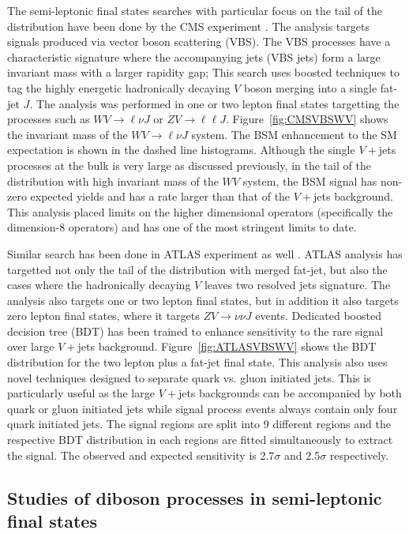 \documentclass[10pt]{article}
\begin{document}
The semi-leptonic final states searches with particular focus on the tail of the distribution have been done by the CMS experiment \cite{}.
The analysis targets signals produced via vector boson scattering (VBS).
The VBS processes have a characteristic signature where the accompanying jets (VBS jets) form a large invariant mass with a larger rapidity gap;
This search uses boosted techniques to tag the highly energetic hadronically decaying $V$ boson merging into a single fat-jet $J$.
The analysis was performed in one or two lepton final states targetting the processes such as $WV\to \ell\nu J$ or $ZV\to \ell\ell J$.
Figure~\ref{fig:CMSVBSWV} shows the invariant mass of the $WV\to\ell\nu J$ system.
The BSM enhancement to the SM expectation is shown in the dashed line histograms.
Although the single $V+$jets processes at the bulk is very large as discussed previously, in the tail of the distribution with high invariant mass of the $WV$ system, the BSM signal has non-zero expected yields and has a rate larger than that of the $V+$jets background.
This analysis placed limits on the higher dimensional operators (specifically the dimension-8 operators) and has one of the most stringent limits to date.

Similar search has been done in ATLAS experiment as well \cite{}.
ATLAS analysis has targetted not only the tail of the distribution with merged fat-jet, but also the cases where the hadronically decaying $V$ leaves two resolved jets signature.
The analysis also targets one or two lepton final states, but in addition it also targets zero lepton final states, where it targets $ZV\to \nu\nu J$ events.
Dedicated boosted decision tree (BDT) has been trained to enhance sensitivity to the rare signal over large $V+$jets background.
Figure~\ref{fig:ATLASVBSWV} shows the BDT distribution for the two lepton plus a fat-jet final state.
This analysis also uses novel techniques designed to separate quark vs. gluon initiated jets.
This is particularly useful as the large $V+$jets backgrounds can be accompanied by both quark or gluon initiated jets while signal process events always contain only four quark initiated jets.
The signal regions are split into 9 different regions and the respective BDT distribution in each regions are fitted simultaneously to extract the signal.
The observed and expected sensitivity is 2.7$\sigma$ and 2.5$\sigma$ respectively.

\subsection{Studies of diboson processes in semi-leptonic final states}
\label{sec:CMSWV}
\end{document}
